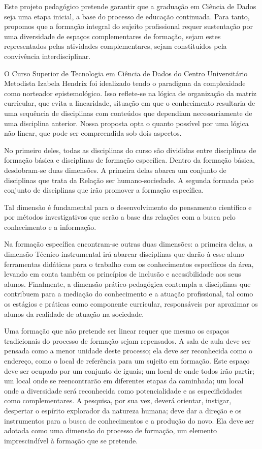 \documentclass[a4paper, 12pt, openright, oneside, german, french, english, brazil]{abntex2}
\begin{document}
Este projeto pedagógico pretende garantir que a graduação em Ciência de Dados seja uma etapa inicial, a base do processo de educação continuada. Para tanto, propomos que a formação integral do sujeito profissional requer sustentação por uma diversidade de espaços complementares de formação, sejam estes representados pelas atividades complementares, sejam constituídos pela convivência interdisciplinar.

O Curso Superior de Tecnologia em Ciência de Dados do Centro Universitário Metodista Izabela Hendrix foi idealizado tendo o paradigma da complexidade como norteador epistemológico. Isso reflete-se na lógica de organização da matriz curricular, que evita a linearidade, situação em que o conhecimento resultaria de uma sequência de disciplinas com conteúdos que dependiam necessariamente de uma disciplina anterior. Nossa proposta opta o quanto possível por uma lógica não linear, que pode ser compreendida sob dois aspectos.

No primeiro deles, todas as disciplinas do curso são divididas entre disciplinas de formação básica e disciplinas de formação específica. Dentro da formação básica, desdobram-se duas dimensões. A primeira delas abarca um conjunto de disciplinas que trata da Relação ser humano-sociedade. A segunda formada pelo conjunto de disciplinas que irão promover a formação específica.

Tal dimensão é fundamental para o desenvolvimento do pensamento científico e por métodos investigativos que serão a base das relações com a busca pelo conhecimento e a informação.

Na formação específica encontram-se outras duas dimensões: a primeira delas, a dimensão Técnico-instrumental irá abarcar disciplinas que darão à esse aluno ferramentas didáticas para o trabalho com os conhecimentos específicos da área, levando em conta também os princípios de inclusão e acessibilidade aos seus alunos. Finalmente, a dimensão prático-pedagógica contempla a disciplinas que contribuem para a mediação do conhecimento e a atuação profissional, tal como os estágios e práticas como componente curricular, responsáveis por aproximar os alunos da realidade de atuação na sociedade.

Uma formação que não pretende ser linear requer que mesmo os espaços tradicionais do processo de formação sejam repensados. A sala de aula deve ser pensada como a menor unidade deste processo; ela deve ser reconhecida como o endereço, como o local de referência para um sujeito em formação. Este espaço deve ser ocupado por um conjunto de iguais; um local de onde todos irão partir; um local onde se reencontrarão em diferentes etapas da caminhada; um local onde a diversidade será reconhecida como potencialidade e as especificidades como complementares. A pesquisa, por sua vez, deverá orientar, instigar, despertar o espírito explorador da natureza humana; deve dar a direção e os instrumentos para a busca de conhecimentos e a produção do novo. Ela deve ser adotada como uma dimensão do processo de formação, um elemento imprescindível à formação que se pretende.
\end{document}
